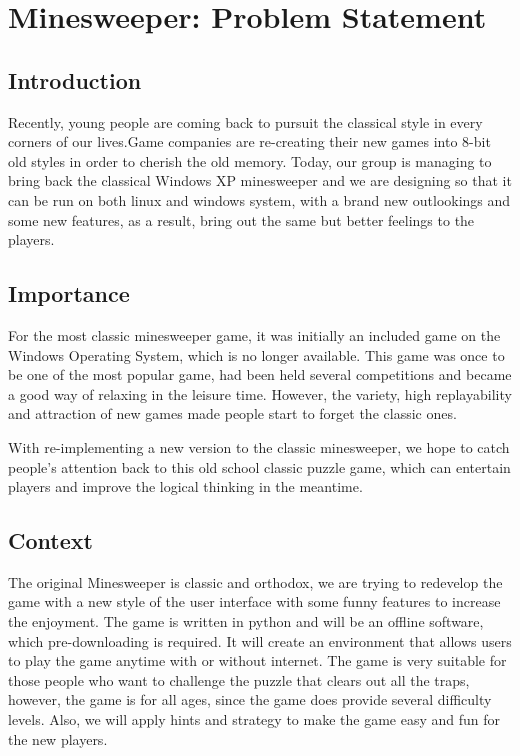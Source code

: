 \documentclass[12pt, oneside]{article}
\author{}
\begin{document}
\marginpar{}
\section*{Minesweeper: Problem Statement}
\subsection*{Introduction}

\newcommand*\apos{\textsc{\char13}}
Recently, young people are coming back to pursuit the classical style in every corners of our lives.Game companies are re-creating their new games into 8-bit old styles in order to cherish the old memory. Today, our group is managing to bring back the classical Windows XP minesweeper and we are designing so that it can be run on both linux and windows system, with a brand new outlookings and some new features, as a result, bring out the same but better feelings to the players.

\subsection*{Importance}

For the most classic minesweeper game, it was initially an included game on the  Windows Operating System, which is no longer available. This game was once to be one of the most popular game, had been held several competitions and became a good way of relaxing in the leisure time. However, the variety, high replayability and attraction of new games made people start to forget the classic ones.

With re-implementing a new version to the classic minesweeper, we hope to catch people’s attention back to this old school classic puzzle game, which can entertain players and improve the logical thinking in the meantime. 


\subsection*{Context}

The original Minesweeper is classic and orthodox, we are trying to redevelop the game with a new style of the user interface with some funny features to increase the enjoyment. The game is written in python and will be an offline software, which pre-downloading is required. It will create an environment that allows users to play the game anytime with or without internet. The game is very suitable for those people who want to challenge the puzzle that clears out all the traps, however, the game is for all ages, since the game does provide several difficulty levels. Also, we will apply hints and strategy to make the game easy and fun for the new players. 
\end{document}

